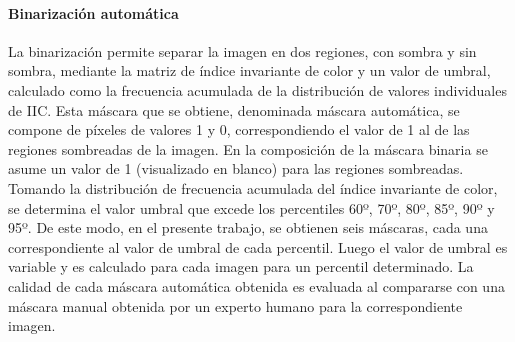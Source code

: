 \paragraph{Binarización automática}
 La binarización permite separar la imagen en dos regiones, con sombra y sin sombra, mediante la matriz de índice invariante de color y un valor de umbral, calculado como la frecuencia acumulada de la distribución de valores individuales de IIC. Esta máscara que se obtiene, denominada máscara automática, se compone de píxeles de valores 1 y 0, correspondiendo el valor de 1 al de las regiones sombreadas de la imagen. En la composición de la máscara binaria se asume un valor de 1 (visualizado en blanco) para las regiones sombreadas. Tomando la distribución de frecuencia acumulada del índice invariante de color, se determina el valor umbral que excede los percentiles 60º, 70º, 80º, 85º, 90º y 95º. De este modo, en el presente trabajo, se obtienen seis máscaras, cada una correspondiente al valor de umbral de cada percentil. Luego el valor de umbral es variable y es calculado para cada imagen para un percentil determinado. La calidad de cada máscara automática obtenida es evaluada al compararse con una máscara manual obtenida por un experto humano para la correspondiente imagen.

